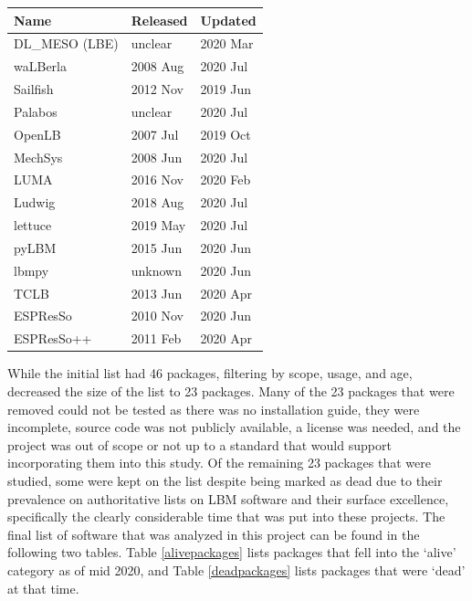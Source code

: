 \documentclass[12pt, notitlepage]{article}
\begin{document}
\begin{center}
	\begin{tabular}{ p{4cm}p{3cm}p{3cm} }
		\hline
		Name & Released & Updated\\
		\hline
		DL\_MESO (LBE) & unclear & 2020 Mar\\
		waLBerla & 2008 Aug & 2020 Jul\\
		Sailfish & 2012 Nov & 2019 Jun\\
		Palabos & unclear & 2020 Jul\\
		OpenLB & 2007 Jul & 2019 Oct\\
		MechSys   & 2008 Jun    & 2020 Jul\\
		LUMA&   2016 Nov   & 2020 Feb\\
		Ludwig& 2018 Aug & 2020 Jul\\
		lettuce    & 2019 May & 2020 Jul\\
		pyLBM & 2015 Jun&   2020 Jun\\
		lbmpy& unknown  & 2020 Jun  \\
		TCLB & 2013 Jun  & 2020 Apr\\
		ESPResSo & 2010 Nov & 2020 Jun\\
		ESPResSo++ & 2011 Feb & 2020 Apr\\
		\hline
	\end{tabular}
	\label{alivepackages}
\end{center}

While the initial list had 46 packages, filtering by scope, usage, and age, decreased the size of the list to 23 packages. Many of the 23 packages that were removed could not be tested as there was no installation guide, they were incomplete, source code was not publicly available, a license was needed, and the project was out of scope or not up to a standard that would support incorporating them into this study. Of the remaining 23 packages that were studied, some were kept on the list despite being marked as dead due to their prevalence on authoritative lists on LBM software and their surface excellence, specifically the clearly considerable time that was put into these projects.  
The final list of software that was analyzed in this project can be found in the following two tables. Table \ref{alivepackages} lists packages that fell into the `alive' category as of mid 2020, and Table \ref{deadpackages} lists packages that were `dead' at that time. \\
\end{document}
